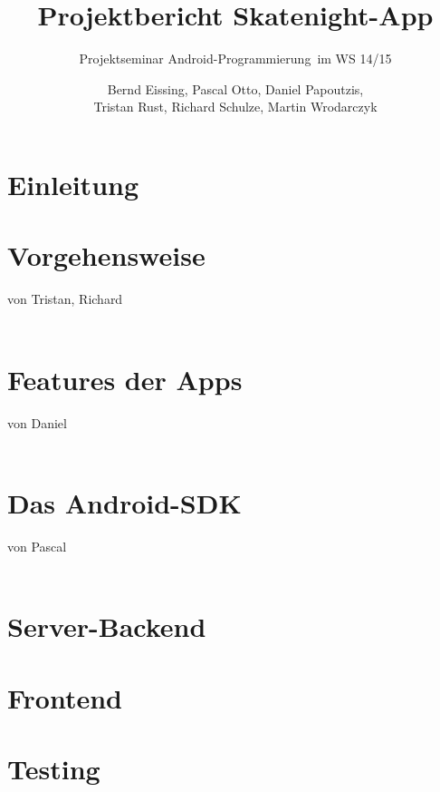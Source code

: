 \documentclass[a4paper, titlepage]{scrartcl}
\title{Projektbericht Skatenight-App}
\subtitle{Projektseminar \glqq Android-Programmierung\grqq\ im WS 14/15}
\author{Bernd Eissing, Pascal Otto, Daniel Papoutzis,\\Tristan Rust, Richard Schulze, Martin Wrodarczyk}
\date{}
\newcommand{\AUTHOR}[1]{
	von #1 \\ \\
}
\begin{document}
\maketitle

\tableofcontents
\newpage

\section{Einleitung}

\section{Vorgehensweise}
\AUTHOR{Tristan, Richard}

\section{Features der Apps}
\AUTHOR{Daniel}

\section{Das Android-SDK}
\AUTHOR{Pascal}

\section{Server-Backend}


\section{Frontend}


\section{Testing}

\end{document}
